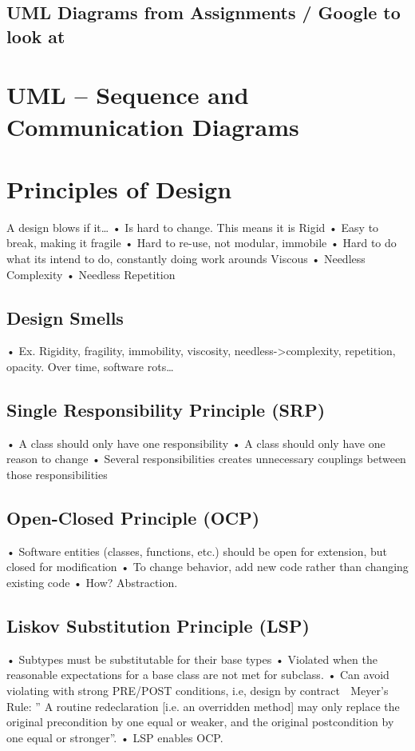 \documentclass[11pt]{article}
\begin{document}
\subsection{UML Diagrams from Assignments / Google to look at}
\section{UML -- Sequence and Communication Diagrams}

\section{Principles of Design}
A design blows if it…
• Is hard to change. This means it is Rigid
• Easy to break, making it fragile
• Hard to re-use, not modular, immobile
• Hard to do what its intend to do, constantly doing work arounds Viscous
• Needless Complexity
• Needless Repetition
\subsection{Design Smells}
• Ex. Rigidity, fragility, immobility, viscosity, needless->complexity, repetition, opacity. Over time, software rots…
\subsection{Single Responsibility Principle (SRP)}
• A class should only have one responsibility
• A class should only have one reason to change
• Several responsibilities creates unnecessary couplings between those responsibilities
\subsection{Open-Closed Principle (OCP)}
• Software entities (classes, functions, etc.) should be open for extension, but closed for modification
• To change behavior, add new code rather than changing existing code
• How? Abstraction.
\subsection{Liskov Substitution Principle (LSP)}
• Subtypes must be substitutable for their base types
• Violated when the reasonable expectations for a base class are not met for subclass.
• Can avoid violating with strong PRE/POST conditions, i.e, design by contract
 Meyer’s Rule:
” A routine redeclaration [i.e. an overridden method] may only replace the original precondition by
one equal or weaker, and the original postcondition by one equal or stronger”.
• LSP enables OCP.
\end{document}
